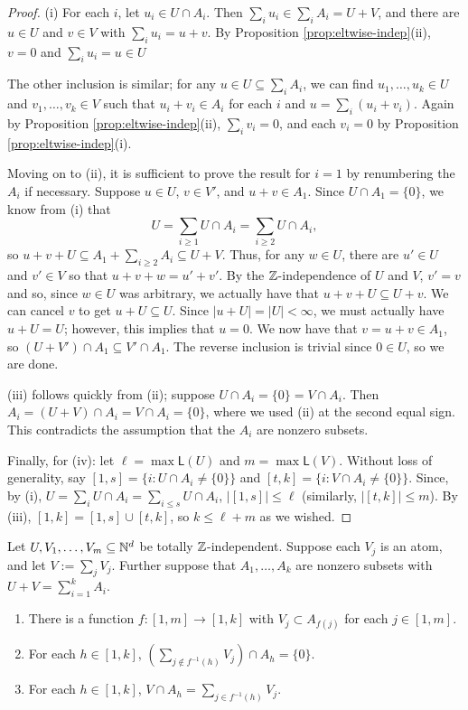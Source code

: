 \begin{proof}
	(i) For each $i$, let $u_i\in U\cap A_i$.
	Then $\sum_i u_i \in \sum_i A_i = U+V$, and there are $u\in U$ and $v\in V$ with $\sum_i u_i = u+v$.
	By Proposition \ref{prop:eltwise-indep}(ii), $v = 0$ and $\sum_i u_i = u \in U$
	
	The other inclusion is similar; for any $u\in U \subseteq \sum_i A_i$, we can find $u_1,\dots,u_k\in U$ and $v_1,\dots, v_k\in V$ such that $u_i+v_i\in A_i$ for each $i$ and $u = \sum_i (u_i + v_i)$.
	Again by Proposition \ref{prop:eltwise-indep}(ii), $\sum_i v_i = 0$, and each $v_i = 0$ by Proposition \ref{prop:eltwise-indep}(i).
	
	Moving on to (ii), it is sufficient to prove the result for $i=1$ by renumbering the $A_i$ if necessary.
	Suppose $u\in U$, $v\in V'$, and $u+v\in A_1$.
	Since $U\cap A_1 = \{0\}$, we know from (i) that
	\[ U = \sum_{i\ge 1} U\cap A_i = \sum_{i\ge 2} U\cap A_i, \]
	so $u+v + U \subseteq A_1 + \sum_{i\ge 2} A_i \subseteq U+V$.
	Thus, for any $w\in U$, there are $u'\in U$ and $v'\in V$ so that $u+v+w = u'+v'$.
	By the $\mathbb{Z}$-independence of $U$ and $V$, $v' = v$ and so, since $w\in U$ was arbitrary, we actually have that $u+v+U \subseteq U + v$.
	We can cancel $v$ to get $u+U \subseteq U$.
	Since $|u+U| = |U| <\infty$, we must actually have $u+U = U$; however, this implies that $u = 0$.
	We now have that $v = u+v \in A_1$, so $(U+V')\cap A_1 \subseteq V' \cap A_1$.
	The reverse inclusion is trivial since $0\in U$, so we are done.
	
	(iii) follows quickly from (ii); suppose $U\cap A_i = \{0\} = V\cap A_i$.
	Then $A_i = (U+V)\cap A_i = V\cap A_i = \{0\}$, where we used (ii) at the second equal sign.
	This contradicts the assumption that the $A_i$ are nonzero subsets.
	
	Finally, for (iv): let $\ell = \max \mathsf{L}(U)$ and $m = \max\mathsf{L}(V)$.
	Without loss of generality, say $[ 1,s ] = \{i: U\cap A_i \neq \{0\} \}$ and $[ t,k ] = \{i: V\cap A_i \neq \{0\} \}$.
	Since, by (i), $U = \sum_i U\cap A_i = \sum_{i\le s} U \cap A_i$, $| [ 1,s ] | \le \ell$ (similarly, $|[ t,k ]| \le m$).
	By (iii), $[ 1,k ] = [ 1,s ] \cup [ t,k ]$, so $k \le \ell + m$ as we wished.
\end{proof}

\begin{lemma} \label{lem:indep-atom-decomp}
	Let $U, V_1,\dots, V_m\subseteq \mathbb{N}^d$ be totally $\mathbb{Z}$-independent.
	Suppose each $V_j$ is an atom, and let $V := \sum_j V_j$.
	Further suppose that $A_1,\dots, A_k$ are nonzero subsets with $U+V = \sum_{i=1}^k A_i$.
	\begin{enumerate}[label={\rm (\roman{*})}]
		\item There is a function $f: [ 1,m ] \to [ 1,k ]$ with $V_j \subset A_{f(j)}$ for each $j\in [ 1,m]$.
		\item For each $h\in [ 1,k]$, $\left( \sum\limits_{j\notin f^{-1}(h)} V_j \right) \cap A_h = \{0\}$.
		\item For each $h\in [ 1,k]$, $V\cap A_h = \sum\limits_{j\in f^{-1}(h)} V_j$.
	\end{enumerate}
\end{lemma}

